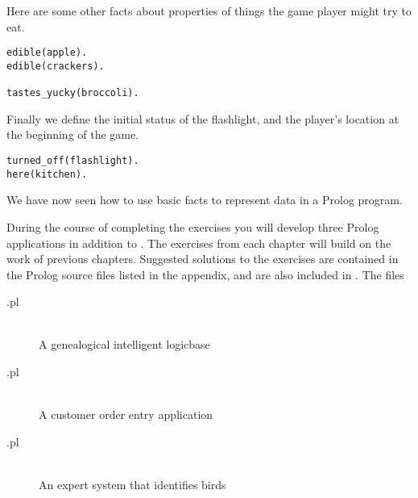 Here are some other facts about properties of things the game player might try
to eat.
\begin{verbatim}
edible(apple).
edible(crackers).

tastes_yucky(broccoli).
\end{verbatim}

Finally we define the initial status of the flashlight, and the player's
location at the beginning of the game.
\begin{verbatim}
turned_off(flashlight).
here(kitchen).
\end{verbatim}
We have now seen how to use basic facts to represent data in a Prolog program.


During the course of completing the exercises you will develop three Prolog
applications in addition to . The exercises from each chapter
will build on the work of previous chapters. Suggested solutions to the
exercises are contained in the Prolog source files listed in the appendix, and
are also included in . The files
\begin{description}
\item[.pl]\ \\A genealogical intelligent logicbase
\item[.pl]\ \\A customer order entry application
\item[.pl]\ \\An expert system that identifies birds
\end{description}

\secup